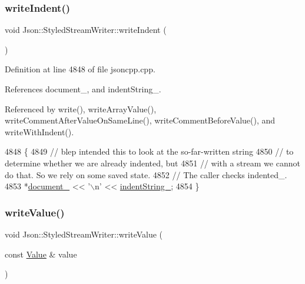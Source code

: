\subsubsection{\texorpdfstring{write\+Indent()}{writeIndent()}}
{\footnotesize\ttfamily void Json\+::\+Styled\+Stream\+Writer\+::write\+Indent (\begin{DoxyParamCaption}{ }\end{DoxyParamCaption})\hspace{0.3cm}{\ttfamily [private]}}



Definition at line 4848 of file jsoncpp.\+cpp.



References document\+\_\+, and indent\+String\+\_\+.



Referenced by write(), write\+Array\+Value(), write\+Comment\+After\+Value\+On\+Same\+Line(), write\+Comment\+Before\+Value(), and write\+With\+Indent().


\begin{DoxyCode}
4848                                      \{
4849   \textcolor{comment}{// blep intended this to look at the so-far-written string}
4850   \textcolor{comment}{// to determine whether we are already indented, but}
4851   \textcolor{comment}{// with a stream we cannot do that. So we rely on some saved state.}
4852   \textcolor{comment}{// The caller checks indented\_.}
4853   *\hyperlink{class_json_1_1_styled_stream_writer_aa8c4e4576f5c3dcb10955d133a092dd6}{document\_} << \textcolor{charliteral}{'\(\backslash\)n'} << \hyperlink{class_json_1_1_styled_stream_writer_a1481433ebe1491ea83b0beb92aed56c2}{indentString\_};
4854 \}
\end{DoxyCode}
\mbox{\label{class_json_1_1_styled_stream_writer_a4359250e09273fa0144021684be001ae}} 
\subsubsection{\texorpdfstring{write\+Value()}{writeValue()}}
{\footnotesize\ttfamily void Json\+::\+Styled\+Stream\+Writer\+::write\+Value (\begin{DoxyParamCaption}\item[{const \hyperlink{class_json_1_1_value}{Value} \&}]{value }\end{DoxyParamCaption})\hspace{0.3cm}{\ttfamily [private]}}



